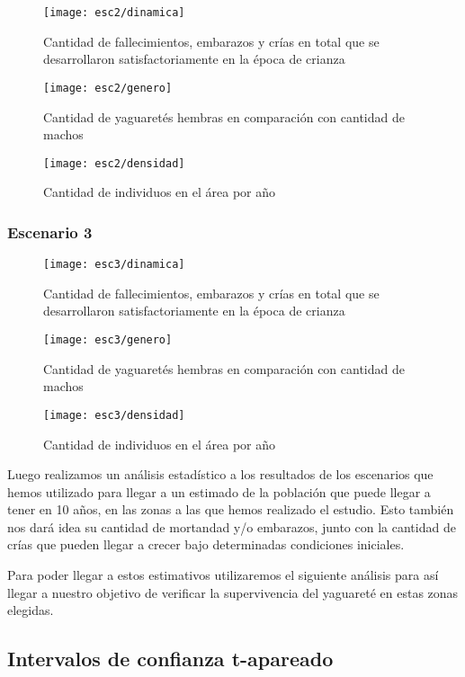 \begin{figure}[H]
    \texttt{[image: esc2/dinamica]}
    \caption{Cantidad de fallecimientos, embarazos y crías en total que se desarrollaron satisfactoriamente en la época de crianza}\label{fig:fig2-1}
    \endminipage\hfill
    \texttt{[image: esc2/genero]}
    \caption{Cantidad de yaguaretés hembras en comparación con cantidad de machos}\label{fig:fig2-2}
    \endminipage\hfill
    \texttt{[image: esc2/densidad]}
    \caption{Cantidad de individuos en el área por año}\label{fig:fig2-3}
    \endminipage
\end{figure}

\subsubsection{Escenario 3}

\begin{figure}[H]
    \texttt{[image: esc3/dinamica]}
    \caption{Cantidad de fallecimientos, embarazos y crías en total que se desarrollaron satisfactoriamente en la época de crianza}\label{fig:fig3-1}
    \endminipage\hfill
    \texttt{[image: esc3/genero]}
    \caption{Cantidad de yaguaretés hembras en comparación con cantidad de machos}\label{fig:fig3-2}
    \endminipage\hfill
    \texttt{[image: esc3/densidad]}
    \caption{Cantidad de individuos en el área por año}\label{fig:fig3-3}
    \endminipage
\end{figure}

Luego realizamos un análisis estadístico a los resultados de los escenarios que hemos utilizado para llegar a un
estimado de la población que puede llegar a tener en 10 años, en las zonas a las que hemos realizado
el estudio. Esto también nos dará idea su cantidad de mortandad y/o embarazos, junto con la cantidad de crías que
pueden llegar a crecer bajo determinadas condiciones iniciales.

Para poder llegar a estos estimativos utilizaremos el siguiente análisis para así llegar a nuestro objetivo de
verificar la supervivencia del yaguareté en estas zonas elegidas.

        \subsection{Intervalos de confianza t-apareado}

